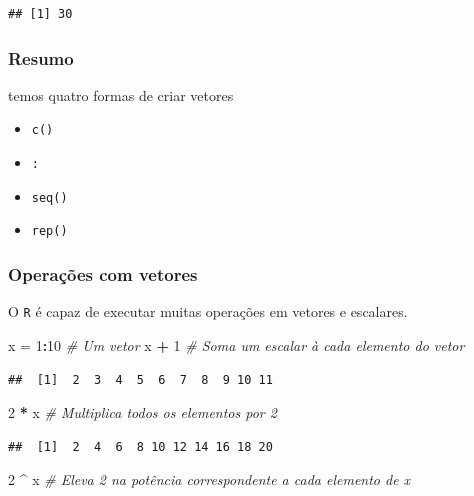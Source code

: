 \documentclass[
]{book}
\newenvironment{Shaded}{\begin{snugshade}}{\end{snugshade}}
\newcommand{\CommentTok}[1]{\textcolor[rgb]{0.56,0.35,0.01}{\textit{#1}}}
\newcommand{\DecValTok}[1]{\textcolor[rgb]{0.00,0.00,0.81}{#1}}
\newcommand{\NormalTok}[1]{#1}
\newcommand{\OperatorTok}[1]{\textcolor[rgb]{0.81,0.36,0.00}{\textbf{#1}}}
\newcommand{\StringTok}[1]{\textcolor[rgb]{0.31,0.60,0.02}{#1}}
\providecommand{\tightlist}{%
  \setlength{\itemsep}{0pt}\setlength{\parskip}{0pt}}
\theoremstyle{definition}
\theoremstyle{definition}
\theoremstyle{definition}
\theoremstyle{remark}
\begin{document}
\begin{verbatim}
## [1] 30
\end{verbatim}

\hypertarget{resumo}{%
\subsubsection{Resumo}\label{resumo}}

temos quatro formas de criar vetores

\begin{itemize}
\tightlist
\item
  \texttt{c()}
\item
  \texttt{:}
\item
  \texttt{seq()}
\item
  \texttt{rep()}
\end{itemize}

\hypertarget{operauxe7uxf5es-com-vetores}{%
\subsubsection{Operações com vetores}\label{operauxe7uxf5es-com-vetores}}

O \texttt{R} é capaz de executar muitas operações em vetores e escalares.

\begin{Shaded}
\begin{Highlighting}[]
\NormalTok{x =}\StringTok{ }\DecValTok{1}\OperatorTok{:}\DecValTok{10}  \CommentTok{# Um vetor}
\NormalTok{x }\OperatorTok{+}\StringTok{ }\DecValTok{1}     \CommentTok{# Soma um escalar à cada elemento do vetor}
\end{Highlighting}
\end{Shaded}

\begin{verbatim}
##  [1]  2  3  4  5  6  7  8  9 10 11
\end{verbatim}

\begin{Shaded}
\begin{Highlighting}[]
\DecValTok{2} \OperatorTok{*}\StringTok{ }\NormalTok{x     }\CommentTok{# Multiplica todos os elementos por 2}
\end{Highlighting}
\end{Shaded}

\begin{verbatim}
##  [1]  2  4  6  8 10 12 14 16 18 20
\end{verbatim}

\begin{Shaded}
\begin{Highlighting}[]
\DecValTok{2} \OperatorTok{^}\StringTok{ }\NormalTok{x     }\CommentTok{# Eleva 2 na potência correspondente a cada elemento de x}
\end{Highlighting}
\end{Shaded}
\end{document}

